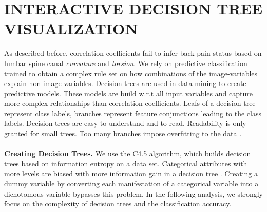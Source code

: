 \documentclass[a4paper,twoside]{style/article}
\begin{document}
\section{\uppercase{Interactive Decision Tree Visualization}}
\label{sec:DecisionTrees}
\noindent As described before, correlation coefficients fail to infer back pain status based on lumbar spine canal \emph{curvature} and \emph{torsion}.
We rely on predictive classification trained to obtain a complex rule set on how combinations of the image-variables explain non-image variables.
Decision trees are used in data mining to create predictive models.
These models are build w.r.t all input variables and capture more complex relationships than correlation coefficients.
Leafs of a decision tree represent class labels, branches represent feature conjunctions leading to the class labels.
Decision trees are easy to understand and to read.
Readability is only granted for small trees.
Too many branches impose overfitting to the data \cite{DecisionTree}.
\\\\
\noindent \textbf{Creating Decision Trees.}
We use the C4.5 algorithm, which builds decision trees based on information entropy on a data set.
Categorical attributes with more levels are biased with more information gain in a decision tree \cite{deng2011bias}.
Creating a dummy variable by converting each manifestation of a categorical variable into a dichotomous variable bypasses this problem.
In the following analysis, we strongly focus on the complexity of decision trees and the classification accuracy.
%
\end{document}
